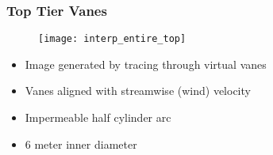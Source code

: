 \documentclass[mathserif]{beamer}
\begin{document}
\begin{frame}
 \frametitle{Top Tier Vanes}
    \begin{figure}[htb]
     \centering
     \texttt{[image: interp\_entire\_top]}
    \end{figure}


   
 
 \begin{block}{}
  \begin{itemize}
   \item Image generated by tracing through virtual vanes
   \item Vanes aligned with streamwise (wind) velocity
   \item Impermeable half cylinder arc
   \item 6 meter inner diameter
  \end{itemize}
 \end{block}
\end{frame}
\end{document}
